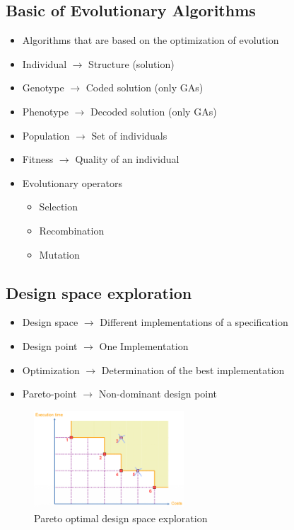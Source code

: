 \subsection{Basic of Evolutionary Algorithms}
\begin{itemize}
	\item Algorithms that are based on the optimization of evolution
	\item \glqq{}Individual\grqq{} $\rightarrow$ Structure (solution)
	\item \glqq{}Genotype\grqq{} $\rightarrow$ Coded solution (only GAs)
	\item \glqq{}Phenotype\grqq{} $\rightarrow$ Decoded solution (only GAs)
	\item \glqq{}Population\grqq{} $\rightarrow$ Set of individuals
	\item \glqq{}Fitness\grqq{} $\rightarrow$ Quality of an individual
	\item Evolutionary operators
\begin{itemize}
	\item Selection
	\item Recombination
	\item Mutation
\end{itemize}
\end{itemize}

\subsection{Design space exploration}
\begin{itemize}
	\item Design space $\rightarrow$ Different implementations of a specification
	\item Design point $\rightarrow$ One Implementation
	\item Optimization $\rightarrow$ Determination of the \glqq{}best\grqq{} implementation
	\item Pareto-point $\rightarrow$ Non-dominant design point 
\end{itemize}

\begin{figure}[h]
	\begin{center}
		\includegraphics[width=0.5\textwidth]{images/Design_space_exploration.png}
		\caption{Pareto optimal design space exploration}
	\end{center}
\end{figure}











